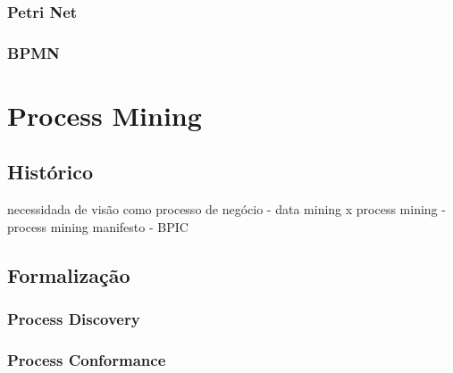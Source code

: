 \documentclass[a4paper]{article}
\begin{document}
\cite{PM_book}
\lipsum[10]
\lipsum[10]
\lipsum[10]
\lipsum[10]
\lipsum[10]
\lipsum[10]

\subsubsection{Petri Net}

\lipsum[10]
\lipsum[10]
\lipsum[10]
\lipsum[10]
\lipsum[10]
\lipsum[10]

\subsubsection{BPMN}

\lipsum[10]
\lipsum[10]
\lipsum[10]
\lipsum[10]
\lipsum[10]
\lipsum[10]

\section{Process Mining}

\cite{PM_book}
\lipsum[10]
\lipsum[10]
\lipsum[10]
\lipsum[10]
\lipsum[10]
\lipsum[10]

\subsection{Histórico}

necessidada de visão como processo de negócio - data mining x process mining - process mining manifesto - BPIC
\lipsum[10]
\lipsum[10]
\lipsum[10]
\lipsum[10]
\lipsum[10]
\lipsum[10]

\subsection{Formalização}

\lipsum[10]
\lipsum[10]
\lipsum[10]
\lipsum[10]
\lipsum[10]
\lipsum[10]

\subsubsection{Process Discovery}

\lipsum[10]
\lipsum[10]
\lipsum[10]
\lipsum[10]
\lipsum[10]
\lipsum[10]

\subsubsection{Process Conformance}
\end{document}
